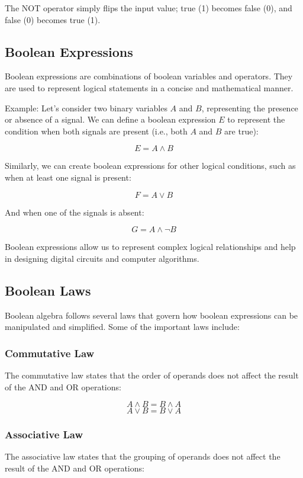 \documentclass{article}
\begin{document}
The NOT operator simply flips the input value; true (1) becomes false (0), and false (0) becomes true (1).

\subsection{Boolean Expressions}

Boolean expressions are combinations of boolean variables and operators. They are used to represent logical statements in a concise and mathematical manner.

Example: Let's consider two binary variables $A$ and $B$, representing the presence or absence of a signal. We can define a boolean expression $E$ to represent the condition when both signals are present (i.e., both $A$ and $B$ are true):

\[ E = A \land B \]

Similarly, we can create boolean expressions for other logical conditions, such as when at least one signal is present:

\[ F = A \lor B \]

And when one of the signals is absent:

\[ G = A \land \lnot B \]

Boolean expressions allow us to represent complex logical relationships and help in designing digital circuits and computer algorithms.

\subsection{Boolean Laws}

Boolean algebra follows several laws that govern how boolean expressions can be manipulated and simplified. Some of the important laws include:

\subsubsection{Commutative Law}

The commutative law states that the order of operands does not affect the result of the AND and OR operations:

\[ A \land B = B \land A \]
\[ A \lor B = B \lor A \]

\subsubsection{Associative Law}

The associative law states that the grouping of operands does not affect the result of the AND and OR operations:
\end{document}

